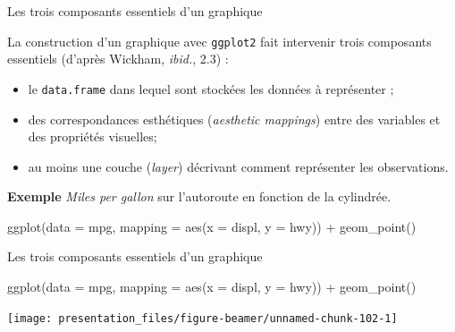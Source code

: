 \documentclass[12pt,ignorenonframetext,handout,]{beamer}
\newenvironment{Shaded}{}{}
\newcommand{\DataTypeTok}[1]{#1}
\newcommand{\KeywordTok}[1]{\textcolor[rgb]{0.00,0.00,1.00}{#1}}
\newcommand{\NormalTok}[1]{#1}
\newcommand{\OperatorTok}[1]{#1}
\newcommand{\StringTok}[1]{\textcolor[rgb]{0.00,0.50,0.50}{#1}}
\providecommand{\tightlist}{%
  \setlength{\itemsep}{0pt}\setlength{\parskip}{0pt}}
\renewenvironment{Shaded}{\begin{snugshade}}{\end{snugshade}}
\newcommand{\intertitre}[1]{\textcolor{redInsee}{\textbf{#1}}}
\begin{document}
\begin{frame}[fragile]{\large Les trois composants essentiels d’un
graphique}
\protect\hypertarget{les-trois-composants-essentiels-dun-graphique}{}

La construction d’un graphique avec \texttt{ggplot2} fait intervenir
trois composants essentiels (d’après Wickham, \emph{ibid.}, 2.3) :

\begin{itemize}
\tightlist
\item
  le \texttt{data.frame} dans lequel sont stockées les données à
  représenter ;
\item
  des correspondances esthétiques (\emph{aesthetic mappings}) entre des
  variables et des propriétés visuelles;
\item
  au moins une couche (\emph{layer}) décrivant comment représenter les
  observations.
\end{itemize}

\pause

\intertitre{Exemple} \emph{Miles per gallon} sur l’autoroute en fonction
de la cylindrée.

\center \small

\begin{Shaded}
\begin{Highlighting}[]
\KeywordTok{ggplot}\NormalTok{(}\DataTypeTok{data =}\NormalTok{ mpg, }\DataTypeTok{mapping =} \KeywordTok{aes}\NormalTok{(}\DataTypeTok{x =}\NormalTok{ displ, }\DataTypeTok{y =}\NormalTok{ hwy)) }\OperatorTok{+}
\StringTok{  }\KeywordTok{geom_point}\NormalTok{()}
\end{Highlighting}
\end{Shaded}

\end{frame}

\begin{frame}[fragile]{\large Les trois composants essentiels d’un
graphique}
\protect\hypertarget{les-trois-composants-essentiels-dun-graphique-1}{}

\center \small

\begin{Shaded}
\begin{Highlighting}[]
\KeywordTok{ggplot}\NormalTok{(}\DataTypeTok{data =}\NormalTok{ mpg, }\DataTypeTok{mapping =} \KeywordTok{aes}\NormalTok{(}\DataTypeTok{x =}\NormalTok{ displ, }\DataTypeTok{y =}\NormalTok{ hwy)) }\OperatorTok{+}
\StringTok{  }\KeywordTok{geom_point}\NormalTok{()}
\end{Highlighting}
\end{Shaded}

\texttt{[image: presentation\_files/figure-beamer/unnamed-chunk-102-1]}

\end{frame}
\end{document}
